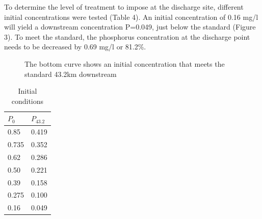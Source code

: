 \documentclass[titlepage,11pt]{article}
\begin{document}
To determine the level of treatment to impose at the discharge site,
different initial concentrations were tested (Table 4).  An initial
concentration of 0.16 mg/l will yield a downstream concentration
P=0.049, just below the standard (Figure 3).  To meet the standard,
the phosphorus concentration at the discharge point needs to be
decreased by 0.69 mg/l or 81.2\%.

\begin{figure}[h] \label{fig:curves}
\begin{center}
 \caption{The bottom
curve shows an initial concentration that meets the standard 43.2km
downstream}
\end{center}
\end{figure}

\begin{table}[h]
\begin{center}
\caption{Initial conditions}
\begin{tabular}{|l|l|}
\hline
{\bf $P_0$}& {\bf $P_{43.2}$} \\
\hline
       0.85 &    0.419   \\
\hline
      0.735 &    0.352   \\
\hline
       0.62 &    0.286   \\
\hline
       0.50 &    0.221   \\
\hline
        0.39&    0.158   \\
\hline
       0.275&    0.100   \\
\hline
        0.16&    0.049   \\
\hline
\end{tabular}
\end{center}
\end{table}
\end{document}
